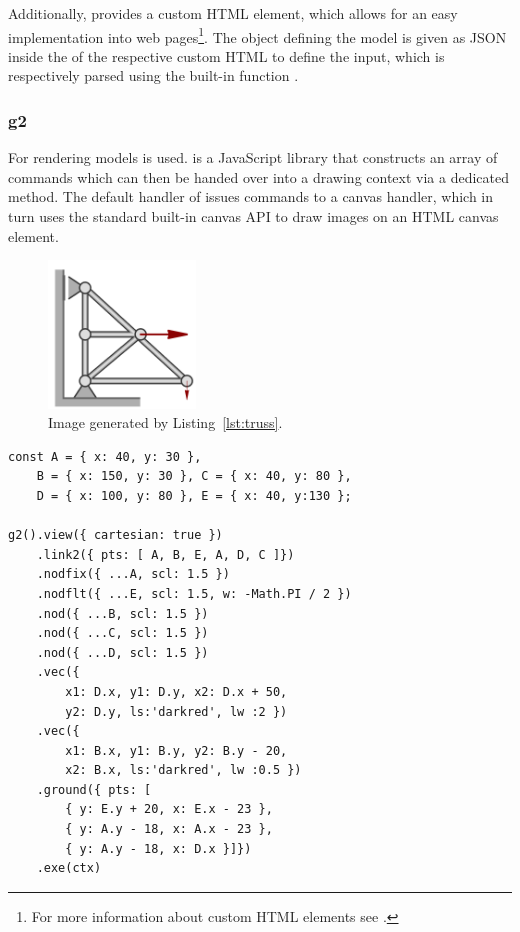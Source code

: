 Additionally,  provides a custom HTML element, which allows for an easy implementation into web pages\footnote{For more information about custom HTML elements see .}.
The object defining the model is given as JSON inside the  of the respective custom HTML to define the input, which is respectively parsed using the built-in function .

\subsubsection{g2}

For rendering models  is used.
 is a JavaScript library that constructs an array of commands which can then be handed over into a drawing context via a dedicated  method.
The default handler of  issues commands to a canvas handler, which in turn uses the standard built-in canvas API to draw images on an HTML canvas element.

\begin{figure}
    \centering
    \includegraphics[width=0.35\textwidth]{images/truss.png}
    \caption{Image generated by Listing~\ref{lst:truss}.}\label{fig:truss}
\end{figure}

\begin{lstlisting}[label={lst:truss}, caption={Example code of a truss defined with g2.}]
const A = { x: 40, y: 30 },
    B = { x: 150, y: 30 }, C = { x: 40, y: 80 },
    D = { x: 100, y: 80 }, E = { x: 40, y:130 };

g2().view({ cartesian: true })
    .link2({ pts: [ A, B, E, A, D, C ]})
    .nodfix({ ...A, scl: 1.5 })
    .nodflt({ ...E, scl: 1.5, w: -Math.PI / 2 })
    .nod({ ...B, scl: 1.5 })
    .nod({ ...C, scl: 1.5 })
    .nod({ ...D, scl: 1.5 })
    .vec({
        x1: D.x, y1: D.y, x2: D.x + 50,
        y2: D.y, ls:'darkred', lw :2 })
    .vec({
        x1: B.x, y1: B.y, y2: B.y - 20,
        x2: B.x, ls:'darkred', lw :0.5 })
    .ground({ pts: [
        { y: E.y + 20, x: E.x - 23 },
        { y: A.y - 18, x: A.x - 23 },
        { y: A.y - 18, x: D.x }]})
    .exe(ctx)
\end{lstlisting}

